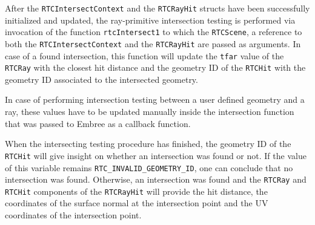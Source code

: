 After the \texttt{RTCIntersectContext} and the \texttt{RTCRayHit} structs have been successfully initialized and updated, the ray-primitive intersection testing is performed via invocation of the function \texttt{rtcIntersect1} to which the \texttt{RTCScene}, a reference to both the \texttt{RTCIntersectContext} and the \texttt{RTCRayHit} are passed as arguments. In case of a found intersection, this function will update the \texttt{tfar} value of the \texttt{RTCRay} with the closest hit distance and the geometry ID of the \texttt{RTCHit} with the geometry ID associated to the intersected geometry.

In case of performing intersection testing between a user defined geometry and a ray, these values have to be updated manually inside the intersection function that was passed to Embree as a callback function.

When the intersecting testing procedure has finished, the geometry ID of the \texttt{RTCHit} will give insight on whether an intersection was found or not. If the value of this variable remains \texttt{RTC\_INVALID\_GEOMETRY\_ID}, one can conclude that no intersection was found. Otherwise, an intersection was found and the \texttt{RTCRay} and \texttt{RTCHit} components of the \texttt{RTCRayHit} will provide the hit distance, the coordinates of the surface normal at the intersection point and the UV coordinates of the intersection point.